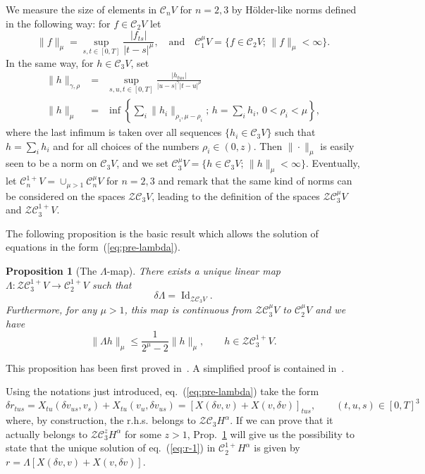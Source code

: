 \documentclass[a4paper,12pt,reqno]{article}
\newcommand{\ott}{[0,T]}
\newcommand{\der}{\delta}
\newcommand{\CC}{\mathcal{C}}
\newcommand{\norm}[1]{\lVert #1\rVert}
\newcommand{\cZ}{\mathcal{Z}}
\DeclareMathOperator{\id}{\text{Id}}
\newtheorem{proposition}[theorem]{Proposition}
\begin{document}
We measure the size of elements in $\CC_n V$ for $n=2,3$  by H\"older-like norms
defined in the following way: for $f \in \CC_2 V $ let
$$
\norm{f}_{\mu} =
\sup_{s,t\in\ott}\frac{|f_{ts}|}{|t-s|^\mu},
\quad\mbox{and}\quad
\CC_1^\mu V =\{ f \in \CC_2 V;\, \norm{f}_{\mu}<\infty  \}.
$$
In the same way, for $h \in \CC_3 V$, set
\begin{eqnarray}
  \label{eq:normOCC2}
  \norm{h}_{\gamma,\rho} &=& \sup_{s,u,t\in\ott} 
\frac{|h_{tus}|}{|u-s|^\gamma |t-u|^\rho}\\
\|h\|_\mu &= &
\inf\left \{\sum_i \|h_i\|_{\rho_i,\mu-\rho_i} ;\, h =
 \sum_i h_i,\, 0 < \rho_i < \mu \right\} ,\nonumber
\end{eqnarray}
where the last infimum is taken over all sequences $\{h_i \in \CC_3 V  \}$ such that $h
= \sum_i h_i$ and for all choices of the numbers $\rho_i \in (0,z)$.
Then  $\|\cdot\|_\mu$ is easily seen to be a norm on $\CC_3 V$, and we set
$
\CC_3^\mu V =\{ h\in\CC_3 V ;\, \|h\|_\mu<\infty \}
$.
Eventually,
let $\CC_n^{1+} V  = \cup_{\mu > 1} \CC_n^\mu V $ for $n =2,3$
and remark that the same kind of norms can be considered on the
spaces $\cZ \CC_3 V $, leading to the definition of the spaces
$\cZ \CC_3^\mu V $ and $\cZ \CC_3^{1+} V $. 

\vspace{0.3cm}

The following proposition is the basic result which allows the
solution of equations in the form~(\ref{eq:pre-lambda}).

\begin{proposition}[The $\Lambda$-map]
\label{prop:Lambda}
There exists a unique linear map $\Lambda: \cZ \CC^{1+}_3 V 
\to \CC_2^{1+} V $ such that 
$$
\delta \Lambda  = \id_{\cZ \CC_3 V }.
$$
Furthermore, for any $\mu > 1$, 
this map is continuous from $\cZ \CC^{\mu}_3 V $
to $\CC_2^{\mu} V $ and we have
\begin{equation}\label{ineqla}
\|\Lambda h\|_{\mu} \le \frac{1}{2^\mu-2} \|h\|_{\mu} ,\qquad h \in
\cZ \CC^{1+}_3 V . 
\end{equation}
\end{proposition}

This proposition has been first proved in~\cite{MR2091358}. A simplified proof is contained in~\cite{TindelGubinelli}.


\medskip
Using the notations just introduced, eq.~(\ref{eq:pre-lambda}) take
the form
\begin{equation}
  \label{eq:r-1}
\der r_{tus} = X_{tu}(\der v_{us},v_s) + X_{tu}(v_u, \der v_{us}) = [X(\der v,v) + X(v, \der v)]_{tus},
\qquad (t,u,s) \in [0,T]^3  
\end{equation}
where, by construction, the r.h.s. belongs to $\cZ \CC_3 H^\alpha$. If
we can prove that  it actually belongs to $ \cZ \CC^z_3 H^\alpha$
for some $z >1$, Prop.~\ref{prop:Lambda} will give us the possibility to state that the
unique solution of eq.~(\ref{eq:r-1}) in $\CC^{1+}_2 H^\alpha$ is given by
$r = \Lambda [X(\der v,v) + X(v, \der v)]$. 
\end{document}
